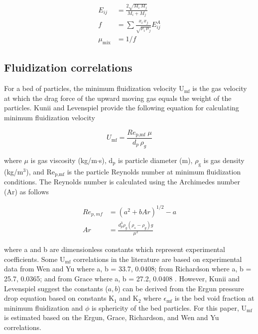 \documentclass{article}
\begin{document}
\begin{align}
    E_{ij} &= \frac{2 \sqrt{M_i\, M_j}}{M_i + M_j} \label{eq:davidson-eij} \\
    f &= \sum \frac{x_i\, x_j}{\sqrt{\mu_i\, \mu_j}} E_{ij}^A \label{eq:davidson-f} \\
    \mu_\text{mix} &= 1 / f \label{eq:davidson-mu}
\end{align}

\subsection{Fluidization correlations}

For a bed of particles, the minimum fluidization velocity U$_\text{mf}$ is the gas velocity at which the drag force of the upward moving gas equals the weight of the particles. Kunii and Levenspiel \cite{Levenspiel-1991} provide the following equation for calculating minimum fluidization velocity

\begin{equation}
    U_\text{mf} = \frac{Re_\text{p,mf}\; \mu}{d_p\, \rho_g}
\end{equation}

\noindent where $\mu$ is gas viscosity (kg/m$\cdot$s), d$_\text{p}$ is particle diameter (m), $\rho_\text{g}$ is gas density (kg/m$^3$), and Re$_\text{p,mf}$ is the particle Reynolds number at minimum fluidization conditions. The Reynolds number is calculated using the Archimedes number (Ar) as follows

\begin{align}
    Re_{p,mf} &= \left( a^2 + b Ar \right)^{1/2} - a \\
    Ar &= \frac{d_p^3 \rho_g (\rho_s - \rho_g) g}{\mu^2}
\end{align}

\noindent where a and b are dimensionless constants which represent experimental coefficients. Some U$_\text{mf}$ correlations in the literature are based on experimental data from Wen and Yu where a, b = 33.7, 0.0408; from Richardson where a, b = 25.7, 0.0365; and from Grace where a, b = 27.2, 0.0408 \cite{Levenspiel-1991}. However, Kunii and Levenspiel \cite{Levenspiel-1991} suggest the constants ($a, b$) can be derived from the Ergun pressure drop equation based on constants K$_1$ and K$_2$ where $\epsilon_\text{mf}$ is the bed void fraction at minimum fluidization and $\phi$ is sphericity of the bed particles. For this paper, U$_\text{mf}$ is estimated based on the Ergun, Grace, Richardson, and Wen and Yu correlations.
\end{document}
